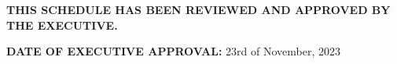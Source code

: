 \textbf{THIS SCHEDULE HAS BEEN REVIEWED AND APPROVED BY THE EXECUTIVE.}

\vspace{0.5cm}
\textbf{DATE OF EXECUTIVE APPROVAL:} 23rd of November, 2023
